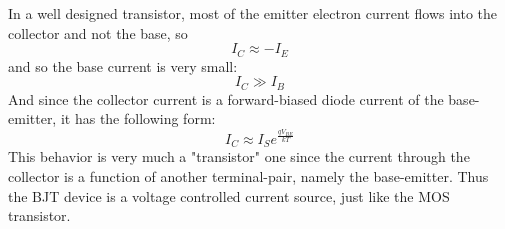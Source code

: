 In a well designed transistor, most of the emitter electron current flows into the collector and not the base, so 
    \begin{equation}
        {I_C} \approx  - {I_E}
    \end{equation}
and so the base current is very small:
    \begin{equation}
        {I_C} \gg {I_B}
    \end{equation}
And since the collector current is a forward-biased diode current of the base-emitter, it has the following form:
    \begin{equation}
        {I_C} \approx {I_S}{e^{\frac{{q{V_{BE}}}}{{kT}}}}
    \end{equation}
This behavior is very much a "transistor" one since the current through the collector is a function of another terminal-pair, namely the base-emitter.  Thus the BJT device is a voltage controlled current source, just like the MOS transistor.
